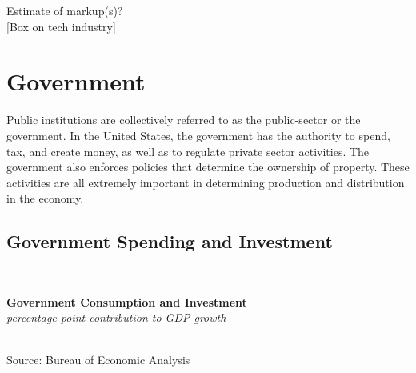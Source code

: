 \documentclass{report}
\makeatletter
\newcommand{\tbllink}[1]{\href{https://raw.githubusercontent.com/bdecon/US-chartbook/master/chartbook/data/#1}{\faTable}}
\newcommand*\short[1]{\expandafter\@gobbletwo\number\numexpr#1\relax}
\newcommand{\sbar}[4]{
		\addplot[ybar stacked, bar width=2.7pt, draw opacity=0, fill=#1] 
			table [x=#2, y=#3, col sep=comma]{#4};}
\newcommand{\dateaxisticks}{
		date coordinates in=x, axis line style={draw=none},
		xmax={2020-02-01},
		max space between ticks=40,	    
		xtick={{1990-01-01}, {1992-01-01}, {1994-01-01}, 
			{1996-01-01}, {1998-01-01}, {2000-01-01}, 
			{2002-01-01}, {2004-01-01}, {2006-01-01},
			{2008-01-01}, {2010-01-01}, {2012-01-01}, {2014-01-01},
		    {2016-01-01}, {2018-01-01}, {2020-01-01}},
		minor xtick={{1989-01-01}, {1991-01-01}, {1993-01-01},
			{1995-01-01}, {1997-01-01}, {1999-01-01}, 
			{2001-01-01}, {2003-01-01}, {2005-01-01}, {2007-01-01},
		    {2009-01-01}, {2011-01-01}, {2013-01-01}, {2015-01-01},
		    {2017-01-01}, {2019-01-01}},
		enlarge y limits={0.06}, enlarge x limits={0.01},
		}
\newcommand{\bbar}[2]{extra #1 ticks = {{#2}}, extra #1 tick labels = ,
		extra #1 tick style = {grid=major, grid style={thick, black!25}},}
\newcommand{\rbars}{
		\fill[color=black!10] (axis cs:{1990-07-01},\pgfkeysvalueof{/pgfplots/ymin}) rectangle 
			(axis cs:{1991-03-01}, \pgfkeysvalueof{/pgfplots/ymax});
		\fill[color=black!10] (axis cs:{2007-12-01},\pgfkeysvalueof{/pgfplots/ymin}) rectangle 
			(axis cs:{2009-07-01}, \pgfkeysvalueof{/pgfplots/ymax});
		\fill[color=black!10] (axis cs:{2001-03-01},\pgfkeysvalueof{/pgfplots/ymin}) rectangle 
			(axis cs:{2001-11-01}, \pgfkeysvalueof{/pgfplots/ymax});}
\makeatother
\begin{document}
{{{{\begin{minipage}{0.76\textwidth}
Estimate of markup(s)?\\

[Box on tech industry]\\

\end{minipage}

\newpage

\begin{minipage}{0.76\textwidth}
\section*{\color{darkgray}\LARGE \seriffont Government}
\label{sec:gov}
\normalsize

\small Public institutions are collectively referred to as the public-sector or the government. In the United States, the government has the authority to spend, tax, and create money, as well as to regulate private sector activities. The government also enforces policies that determine the ownership of property. These activities are all extremely important in determining production and distribution in the economy.


\subsection*{\color{black!70} \seriffont Government Spending and Investment}
\small   \\
\vspace{2mm}

\noindent \normalsize \textbf{Government Consumption and Investment}\\
\footnotesize{\textit{percentage point contribution to GDP growth}}\\
\noindent \hspace*{-2mm} \\
\footnotesize{Source: Bureau of Economic Analysis} \hfill \tbllink{gov.csv}
\vspace{10mm}



\end{minipage}}}}}
\end{document}
